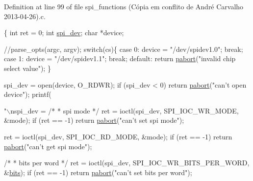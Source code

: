 Definition at line 99 of file spi\-\_\-functions (\-Cópia em conflito de André Carvalho 2013-\/04-\/26).\-c.


\begin{DoxyCode}
\{
        \textcolor{keywordtype}{int} ret = 0;
        \textcolor{keywordtype}{int} \hyperlink{CommunicationV0_2communication_8c_a4788f0a5355494bc6c13690e28f43783}{spi\_dev};
        \textcolor{keywordtype}{char} *device;

        \textcolor{comment}{//parse\_opts(argc, argv);}
        \textcolor{keywordflow}{switch}(cs)\{
          \textcolor{keywordflow}{case} 0:
            device = \textcolor{stringliteral}{"/dev/spidev1.0"};
            \textcolor{keywordflow}{break};
          \textcolor{keywordflow}{case} 1:
            device = \textcolor{stringliteral}{"/dev/spidev1.1"};
            \textcolor{keywordflow}{break};
          \textcolor{keywordflow}{default}:
            \textcolor{keywordflow}{return} \hyperlink{spi__functions_01_07C_xC3_xB3pia_01em_01conflito_01de_01Andr_xC3_xA9_01Carvalho_012013-04-26_08_8c_aabfca8320b0c76774f01467703e17302}{pabort}(\textcolor{stringliteral}{"invalid chip select value"});
        \}
            
        
        spi\_dev = open(device, O\_RDWR);
        \textcolor{keywordflow}{if} (spi\_dev < 0)
                \textcolor{keywordflow}{return} \hyperlink{spi__functions_01_07C_xC3_xB3pia_01em_01conflito_01de_01Andr_xC3_xA9_01Carvalho_012013-04-26_08_8c_aabfca8320b0c76774f01467703e17302}{pabort}(\textcolor{stringliteral}{"can't open device"});
printf(\textcolor{stringliteral}{"\(\backslash\)nspi\_dev = %
        \textcolor{comment}{/*}
\textcolor{comment}{         * spi mode}
\textcolor{comment}{         */}
        ret = ioctl(spi\_dev, SPI\_IOC\_WR\_MODE, &mode);
        \textcolor{keywordflow}{if} (ret == -1)
                \textcolor{keywordflow}{return} \hyperlink{spi__functions_01_07C_xC3_xB3pia_01em_01conflito_01de_01Andr_xC3_xA9_01Carvalho_012013-04-26_08_8c_aabfca8320b0c76774f01467703e17302}{pabort}(\textcolor{stringliteral}{"can't set spi mode"});

        ret = ioctl(spi\_dev, SPI\_IOC\_RD\_MODE, &mode);
        \textcolor{keywordflow}{if} (ret == -1)
                \textcolor{keywordflow}{return} \hyperlink{spi__functions_01_07C_xC3_xB3pia_01em_01conflito_01de_01Andr_xC3_xA9_01Carvalho_012013-04-26_08_8c_aabfca8320b0c76774f01467703e17302}{pabort}(\textcolor{stringliteral}{"can't get spi mode"});

        \textcolor{comment}{/*}
\textcolor{comment}{         * bits per word}
\textcolor{comment}{         */}
        ret = ioctl(spi\_dev, SPI\_IOC\_WR\_BITS\_PER\_WORD, &\hyperlink{spi__functions_01_07C_xC3_xB3pia_01em_01conflito_01de_01Andr_xC3_xA9_01Carvalho_012013-04-26_08_8c_a46a6da6b1936191571fd30b2a749f38c}{bits});
        \textcolor{keywordflow}{if} (ret == -1)
                \textcolor{keywordflow}{return} \hyperlink{spi__functions_01_07C_xC3_xB3pia_01em_01conflito_01de_01Andr_xC3_xA9_01Carvalho_012013-04-26_08_8c_aabfca8320b0c76774f01467703e17302}{pabort}(\textcolor{stringliteral}{"can't set bits per word"});

}
\end{DoxyCode}
